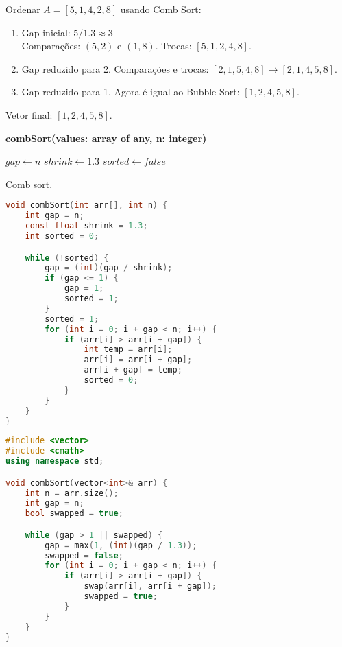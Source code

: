 \begin{exmp}
Ordenar $A = [5, 1, 4, 2, 8]$ usando Comb Sort:

\begin{enumerate}
    \item Gap inicial: $5/1.3 \approx 3$ \\
    Comparações: $(5,2)$ e $(1,8)$. Trocas: $[5,1,2,4,8]$.
    \item Gap reduzido para 2. Comparações e trocas: $[2,1,5,4,8] \rightarrow [2,1,4,5,8]$.
    \item Gap reduzido para 1. Agora é igual ao Bubble Sort: $[1,2,4,5,8]$.
\end{enumerate}

Vetor final: $[1,2,4,5,8]$.
\end{exmp}

\begin{center}
\begin{minipage}{.9\linewidth}
\begin{algorithm}[H]
\DontPrintSemicolon
\textbf{combSort(values: array of any, n: integer)}

$gap \gets n$\;
$shrink \gets 1.3$\;
$sorted \gets false$\;

\caption{Comb sort.}
\label{lab:alg-combSort}
\end{algorithm}
\end{minipage}
\end{center}

\begin{lstlisting}[language=C,caption={Comb sort em C},captionpos=t]
void combSort(int arr[], int n) {
    int gap = n;
    const float shrink = 1.3;
    int sorted = 0;

    while (!sorted) {
        gap = (int)(gap / shrink);
        if (gap <= 1) {
            gap = 1;
            sorted = 1;
        }
        sorted = 1;
        for (int i = 0; i + gap < n; i++) {
            if (arr[i] > arr[i + gap]) {
                int temp = arr[i];
                arr[i] = arr[i + gap];
                arr[i + gap] = temp;
                sorted = 0;
            }
        }
    }
}
\end{lstlisting}

\begin{lstlisting}[language=C++,caption={Comb sort em C++},captionpos=t]
#include <vector>
#include <cmath>
using namespace std;

void combSort(vector<int>& arr) {
    int n = arr.size();
    int gap = n;
    bool swapped = true;

    while (gap > 1 || swapped) {
        gap = max(1, (int)(gap / 1.3));
        swapped = false;
        for (int i = 0; i + gap < n; i++) {
            if (arr[i] > arr[i + gap]) {
                swap(arr[i], arr[i + gap]);
                swapped = true;
            }
        }
    }
}
\end{lstlisting}

